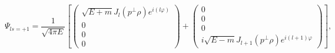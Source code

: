 \begin{equation}
\Psi _{ls=+1}=\frac{1}{\sqrt{4\pi E}}\left[\left(
\begin{array}{c}
\sqrt{E+m}J_{l}\left( p^{\bot }\rho \right) e^{i(l\varphi )} \\
0 \\
0 \\
0
\end{array}
\right) +\left(
\begin{array}{c}
0 \\
0 \\
0 \\
i\sqrt{E-m}J_{l+1}\left( p^{\bot }\rho \right) e^{i(l+1)\varphi }
\end{array}
\right)\right],
\end{equation}


